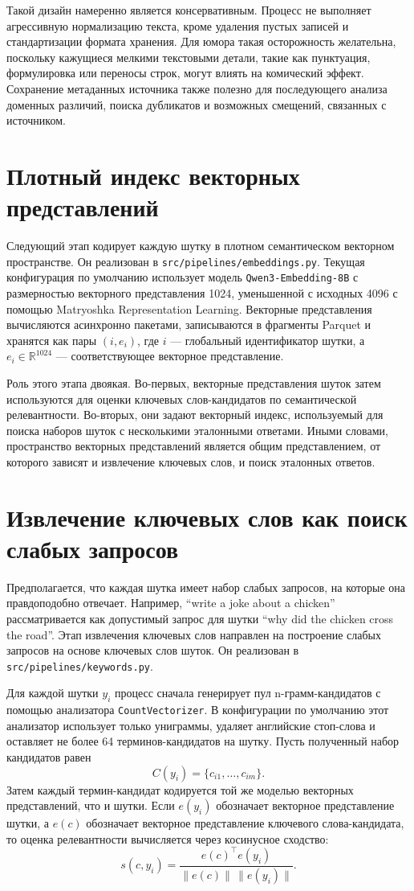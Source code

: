 Такой дизайн намеренно является консервативным. Процесс не выполняет агрессивную нормализацию текста, кроме удаления пустых записей и стандартизации формата хранения. Для юмора такая осторожность желательна, поскольку кажущиеся мелкими текстовыми детали, такие как пунктуация, формулировка или переносы строк, могут влиять на комический эффект. Сохранение метаданных источника также полезно для последующего анализа доменных различий, поиска дубликатов и возможных смещений, связанных с источником.

\section{Плотный индекс векторных представлений}

Следующий этап кодирует каждую шутку в плотном семантическом векторном пространстве. Он реализован в \texttt{src/pipelines/embeddings.py}. Текущая конфигурация по умолчанию использует модель \texttt{Qwen3-Embedding-8B} с размерностью векторного представления 1024, уменьшенной с исходных 4096 с помощью Matryoshka Representation Learning. Векторные представления вычисляются асинхронно пакетами, записываются в фрагменты Parquet и хранятся как пары \((i, e_i)\), где \(i\) --- глобальный идентификатор шутки, а \(e_i \in \mathbb{R}^{1024}\) --- соответствующее векторное представление.

Роль этого этапа двоякая. Во-первых, векторные представления шуток затем используются для оценки ключевых слов-кандидатов по семантической релевантности. Во-вторых, они задают векторный индекс, используемый для поиска наборов шуток с несколькими эталонными ответами. Иными словами, пространство векторных представлений является общим представлением, от которого зависят и извлечение ключевых слов, и поиск эталонных ответов.

\section{Извлечение ключевых слов как поиск слабых запросов}

Предполагается, что каждая шутка имеет набор слабых запросов, на которые она правдоподобно отвечает. Например, ``write a joke about a chicken'' рассматривается как допустимый запрос для шутки ``why did the chicken cross the road''. Этап извлечения ключевых слов направлен на построение слабых запросов на основе ключевых слов шуток. Он реализован в \texttt{src/pipelines/keywords.py}.

Для каждой шутки \(y_i\) процесс сначала генерирует пул n-грамм-кандидатов с помощью анализатора \texttt{CountVectorizer}. В конфигурации по умолчанию этот анализатор использует только униграммы, удаляет английские стоп-слова и оставляет не более 64 терминов-кандидатов на шутку. Пусть полученный набор кандидатов равен
\[
 C(y_i)=\{c_{i1},\dots,c_{im}\}.
\]
Затем каждый термин-кандидат кодируется той же моделью векторных представлений, что и шутки. Если \(e(y_i)\) обозначает векторное представление шутки, а \(e(c)\) обозначает векторное представление ключевого слова-кандидата, то оценка релевантности вычисляется через косинусное сходство:
\[
 s(c,y_i)=\frac{e(c)^\top e(y_i)}{\lVert e(c)\rVert\,\lVert e(y_i)\rVert}.
\]


